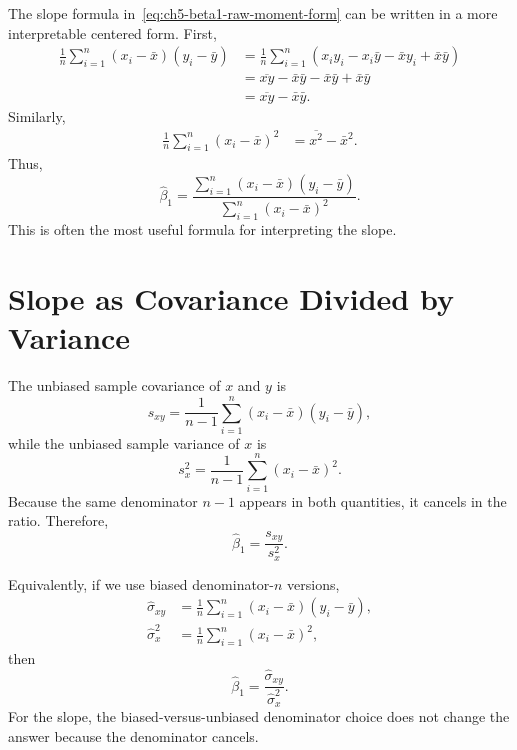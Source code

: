 The slope formula in~\eqref{eq:ch5-beta1-raw-moment-form} can be written in a more interpretable centered form.  First,
\begin{align}
  \frac{1}{n}\sum_{i=1}^n (x_i-\bar{x})(y_i-\bar{y})
  &=\frac{1}{n}\sum_{i=1}^n \left(x_i y_i-x_i\bar{y}-\bar{x}y_i+\bar{x}\bar{y}\right) \\
  &=\overline{xy}-\bar{x}\bar{y}-\bar{x}\bar{y}+\bar{x}\bar{y} \\
  &=\overline{xy}-\bar{x}\bar{y}.
  \label{eq:ch5-centered-cov-identity}
\end{align}
Similarly,
\begin{align}
  \frac{1}{n}\sum_{i=1}^n (x_i-\bar{x})^2
  &=\overline{x^2}-\bar{x}^2.
  \label{eq:ch5-centered-var-identity}
\end{align}
Thus,
\begin{equation}
  \widehat{\beta}_1
  =\frac{\sum_{i=1}^n (x_i-\bar{x})(y_i-\bar{y})}{\sum_{i=1}^n (x_i-\bar{x})^2}.
  \label{eq:ch5-beta1-centered-form}
\end{equation}
This is often the most useful formula for interpreting the slope.

\section{Slope as Covariance Divided by Variance}

The unbiased sample covariance of $x$ and $y$ is
\begin{equation}
  s_{xy}=\frac{1}{n-1}\sum_{i=1}^n (x_i-\bar{x})(y_i-\bar{y}),
  \label{eq:ch5-unbiased-cov}
\end{equation}
while the unbiased sample variance of $x$ is
\begin{equation}
  s_x^2=\frac{1}{n-1}\sum_{i=1}^n (x_i-\bar{x})^2.
  \label{eq:ch5-unbiased-var}
\end{equation}
Because the same denominator $n-1$ appears in both quantities, it cancels in the ratio.  Therefore,
\begin{equation}
  \boxed{\widehat{\beta}_1=\frac{s_{xy}}{s_x^2}.}
  \label{eq:ch5-beta1-cov-var}
\end{equation}

Equivalently, if we use biased denominator-$n$ versions,
\begin{align}
  \widehat{\sigma}_{xy}&=\frac{1}{n}\sum_{i=1}^n (x_i-\bar{x})(y_i-\bar{y}), \\
  \widehat{\sigma}_{x}^2&=\frac{1}{n}\sum_{i=1}^n (x_i-\bar{x})^2,
\end{align}
then
\begin{equation}
  \widehat{\beta}_1=\frac{\widehat{\sigma}_{xy}}{\widehat{\sigma}_{x}^2}.
\end{equation}
For the slope, the biased-versus-unbiased denominator choice does not change the answer because the denominator cancels.

